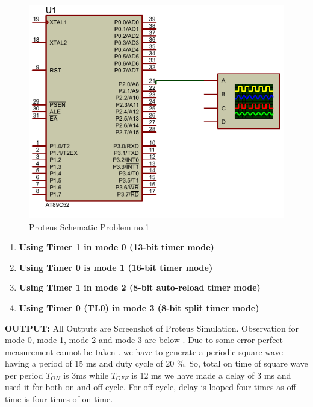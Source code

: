 \documentclass{article}
\begin{document}
\begin{figure}[H]
    \centering
    \includegraphics[scale=1.7,cframe=blue 0.5pt 3pt]{1.PDF}
    \caption{Proteus Schematic Problem no.1}
\end{figure}

\begin{enumerate}
    \item \textbf {Using Timer 1 in mode 0 (13-bit timer mode)}


    \item \textbf {Using Timer 0 is mode 1 (16-bit timer mode)}


    \item \textbf {Using Timer 1 in mode 2 (8-bit auto-reload timer mode)}


    \item \textbf {Using Timer 0 (TL0) in mode 3 (8-bit split timer mode)}

\end{enumerate}



\textbf{OUTPUT:}
All Outputs are Screenshot of Proteus Simulation.
Observation for mode 0, mode 1, mode 2 and  mode 3 are below . Due to some error perfect measurement cannot be taken . we have to generate a periodic square wave
having a period of 15 ms and duty cycle of 20 \%. So, total on
time of square wave per period $T_{ON}$ is 3ms while $T_{OFF}$ is 12 ms
we have made a delay of 3 ms and used it for both on and off cycle. For off cycle, delay is looped four times as off time is four times of on time.
\end{document}
